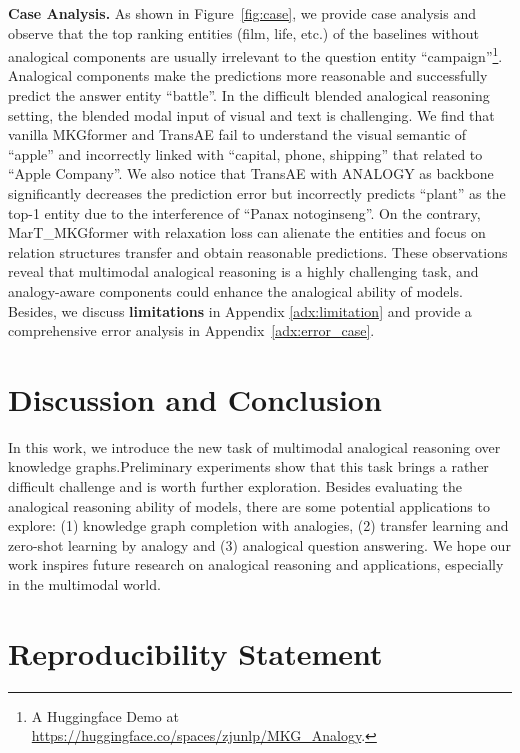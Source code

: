 \documentclass{article} \usepackage{iclr2023_conference,times}
\newcommand{\ours}{MarT}
\begin{document}
\textbf{Case Analysis.}
As shown in Figure~\ref{fig:case}, we provide case analysis and observe that the top ranking entities (film, life, etc.) of the baselines without analogical components are usually irrelevant to the question entity ``campaign''\footnote{A Huggingface Demo at \url{https://huggingface.co/spaces/zjunlp/MKG_Analogy}.}.
Analogical components make the predictions more reasonable and successfully predict the answer entity ``battle''.
In the difficult blended analogical reasoning setting, the blended modal input of visual and text is challenging. We find that vanilla MKGformer and TransAE fail to understand the visual semantic of ``apple'' and incorrectly linked with ``capital, phone, shipping'' that related to ``Apple Company''. 
We also notice that TransAE with ANALOGY as backbone significantly decreases the prediction error but incorrectly predicts ``plant'' as the top-1 entity due to the interference of ``Panax notoginseng''.
On the contrary, {\ours}\_MKGformer with relaxation loss can alienate the entities and focus on relation structures transfer and obtain reasonable predictions. 
These observations reveal that multimodal analogical reasoning is a highly challenging task, and analogy-aware components could enhance the analogical ability of models. 
Besides, we discuss \textbf{limitations} in Appendix \ref{adx:limitation} and provide a comprehensive error analysis in Appendix~\ref{adx:error_case}. 




\section{Discussion and Conclusion} 

In this work, we introduce the new task of multimodal analogical reasoning over knowledge graphs.Preliminary experiments show that this task brings a rather difficult challenge and is worth further exploration. 
Besides evaluating the analogical reasoning ability of models, there are some potential applications to explore: 
(1) knowledge graph completion with analogies,
(2) transfer learning and zero-shot learning by analogy and 
(3) analogical question answering. 
We hope our work inspires future research on analogical reasoning and applications, especially in the multimodal world.


\section*{Reproducibility Statement}
\end{document}
